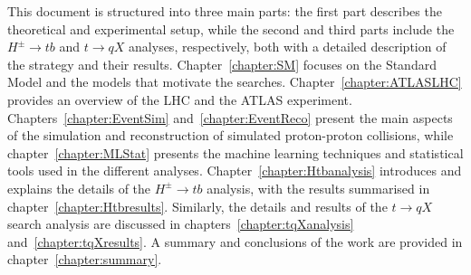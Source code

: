 This document is structured into three main parts: the first part describes the theoretical and experimental setup, while the second and third parts include the $H^\pm\to tb$ and $t\to qX$ analyses, respectively, both with a detailed description of the strategy and their results. Chapter~\ref{chapter:SM} focuses on the Standard Model and the models that motivate the searches. Chapter~\ref{chapter:ATLASLHC} provides an overview of the LHC and the ATLAS experiment. Chapters~\ref{chapter:EventSim} and~\ref{chapter:EventReco} present the main aspects of the simulation and reconstruction of simulated proton-proton collisions, while chapter~\ref{chapter:MLStat} presents the machine learning techniques and statistical tools used in the different analyses. Chapter~\ref{chapter:Htbanalysis} introduces and explains the details of the $H^\pm\to tb$ analysis, with the results summarised in chapter~\ref{chapter:Htbresults}. Similarly, the details and results of the $t\to qX$ search analysis are discussed in chapters~\ref{chapter:tqXanalysis} and~\ref{chapter:tqXresults}. A summary and conclusions of the work are provided in chapter~\ref{chapter:summary}.